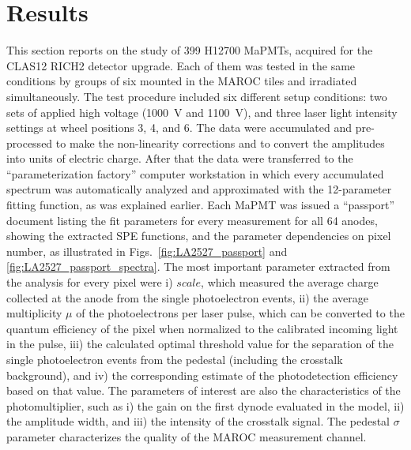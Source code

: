 \section{Results}

This section reports on the study of 399 H12700 MaPMTs, acquired for the CLAS12 RICH2 detector upgrade. Each of them was tested in the same conditions by groups of six mounted in the MAROC tiles and irradiated simultaneously. The test procedure included six different setup conditions: two sets of applied high voltage (1000~V and 1100~V), and three laser light intensity settings at wheel positions 3, 4, and 6. The data were accumulated and pre-processed to make the non-linearity corrections and to convert the amplitudes into units of electric charge. After that the data were transferred to the ``parameterization factory'' computer workstation in which every accumulated spectrum was automatically analyzed and approximated with the 12-parameter fitting function, as was explained earlier. Each MaPMT was issued a ``passport'' document listing the fit parameters for every measurement for all 64 anodes, showing the extracted SPE functions, and the parameter dependencies on pixel number, as illustrated in Figs.~\ref{fig:LA2527_passport} and \ref{fig:LA2527_passport_spectra}. The most important parameter extracted from the analysis for every pixel were i) $scale$, which measured the average charge collected at the anode from the single photoelectron events, ii) the average multiplicity $\mu$ of the photoelectrons per laser pulse, which can be converted to the quantum efficiency of the pixel when normalized to the calibrated incoming light in the pulse, iii) the calculated optimal threshold value for the separation of the single photoelectron events from the pedestal (including the crosstalk background), and iv) the corresponding estimate of the photodetection efficiency based on that value. The parameters of interest are also the characteristics of the photomultiplier, such as i) the gain on the first dynode evaluated in the model, ii) the amplitude width, and iii) the intensity of the crosstalk signal. The pedestal $\sigma$ parameter characterizes the quality of the MAROC measurement channel.

